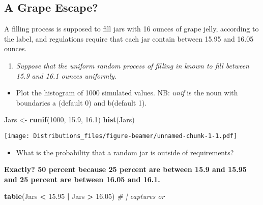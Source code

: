 \documentclass[ignorenonframetext,]{beamer}
\newenvironment{Shaded}{\begin{snugshade}}{\end{snugshade}}
\newcommand{\CommentTok}[1]{\textcolor[rgb]{0.56,0.35,0.01}{\textit{#1}}}
\newcommand{\DecValTok}[1]{\textcolor[rgb]{0.00,0.00,0.81}{#1}}
\newcommand{\FloatTok}[1]{\textcolor[rgb]{0.00,0.00,0.81}{#1}}
\newcommand{\KeywordTok}[1]{\textcolor[rgb]{0.13,0.29,0.53}{\textbf{#1}}}
\newcommand{\NormalTok}[1]{#1}
\newcommand{\OperatorTok}[1]{\textcolor[rgb]{0.81,0.36,0.00}{\textbf{#1}}}
\newcommand{\StringTok}[1]{\textcolor[rgb]{0.31,0.60,0.02}{#1}}
\providecommand{\tightlist}{%
  \setlength{\itemsep}{0pt}\setlength{\parskip}{0pt}}
\begin{document}
\hypertarget{a-grape-escape}{%
\subsection{A Grape Escape?}\label{a-grape-escape}}

A filling process is supposed to fill jars with 16 ounces of grape
jelly, according to the label, and regulations require that each jar
contain between 15.95 and 16.05 ounces.

\begin{enumerate}[<+->]
\tightlist
\item
  \emph{Suppose that the uniform random process of filling in known to
  fill between 15.9 and 16.1 ounces uniformly.}
\end{enumerate}

\begin{itemize}[<+->]
\tightlist
\item
  Plot the histogram of 1000 simulated values. NB: \emph{unif} is the
  noun with boundaries a (default 0) and b(default 1).
\end{itemize}

\begin{Shaded}
\begin{Highlighting}[]
\NormalTok{Jars <-}\StringTok{ }\KeywordTok{runif}\NormalTok{(}\DecValTok{1000}\NormalTok{, }\FloatTok{15.9}\NormalTok{, }\FloatTok{16.1}\NormalTok{)}
\KeywordTok{hist}\NormalTok{(Jars)}
\end{Highlighting}
\end{Shaded}

\texttt{[image: Distributions\_files/figure-beamer/unnamed-chunk-1-1.pdf]}

\begin{itemize}[<+->]
\tightlist
\item
  What is the probability that a random jar is outside of requirements?
\end{itemize}

\textbf{Exactly? 50 percent because 25 percent are between 15.9 and
15.95 and 25 percent are between 16.05 and 16.1.}

\begin{Shaded}
\begin{Highlighting}[]
\KeywordTok{table}\NormalTok{(Jars }\OperatorTok{<}\StringTok{ }\FloatTok{15.95} \OperatorTok{|}\StringTok{ }\NormalTok{Jars }\OperatorTok{>}\StringTok{ }\FloatTok{16.05}\NormalTok{) }\CommentTok{# | captures or}
\end{Highlighting}
\end{Shaded}
\end{document}
